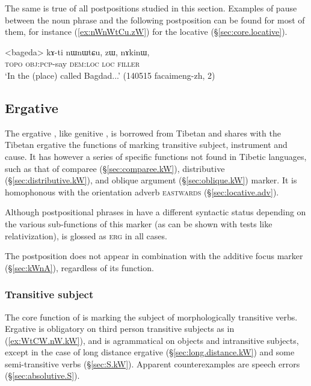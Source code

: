The same is true of all postpositions studied in this section. Examples of pause between the noun phrase and the following postposition can be found for most of them, for instance (\ref{ex:nWnWtCu.zW}) for the locative  (§\ref{sec:core.locative}).

\begin{exe}
\ex \label{ex:nWnWtCu.zW}
\gll  <bageda> kɤ-ti nɯnɯtɕu, zɯ, nɤkinɯ, \\
\textsc{topo} \textsc{obj}:\textsc{pcp}-say \textsc{dem}:\textsc{loc} \textsc{loc} \textsc{filler} \\
\glt `In the (place) called Bagdad...' (140515 facaimeng-zh, 2)
\end{exe}

\subsection{Ergative} \label{sec:erg.kW}
The ergative , like genitive , is borrowed from Tibetan \citep{jacques16comparative} and shares with the Tibetan ergative the functions of marking transitive subject, instrument and cause. It has however a series of specific functions not found in Tibetic languages, such as that of comparee (§\ref{sec:comparee.kW}), distributive (§\ref{sec:distributive.kW}),  and oblique argument (§\ref{sec:oblique.kW}) marker. It is homophonous with the orientation adverb  \textsc{eastwards} (§\ref{sec:locative.adv}).

Although postpositional phrases in  have a different syntactic status depending on the various sub-functions of this marker (as can be shown with tests like relativization),  is glossed as \textsc{erg} in all cases.

The postposition  does not appear in combination with the additive focus marker  (§\ref{sec:kWnA}), regardless of its function.

\subsubsection{Transitive subject} \label{sec:A.kW}
The core function of  is marking the subject of morphologically transitive verbs. Ergative is obligatory on third person transitive subjects as in (\ref{ex:WtCW.nW.kW}), and is agrammatical on objects and intransitive subjects, except in the case of long distance ergative (§\ref{sec:long.distance.kW}) and some semi-transitive verbs (§\ref{sec:S.kW}). Apparent counterexamples are speech errors (§\ref{sec:absolutive.S}).

